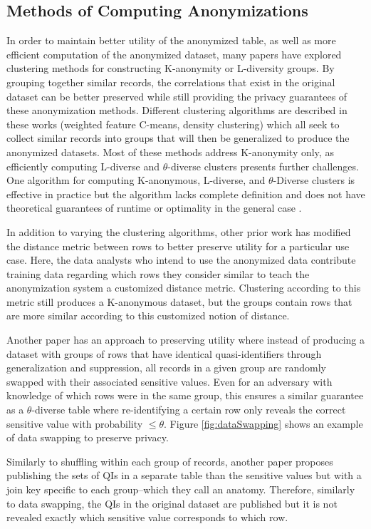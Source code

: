 \subsection{Methods of Computing Anonymizations}
In order to maintain better utility of the anonymized table, as well as more efficient computation of the anonymized dataset, many papers have explored clustering methods for constructing K-anonymity or L-diversity groups. By grouping together similar records, the correlations that exist in the original dataset can be better preserved while still providing the privacy guarantees of these anonymization methods\cite{niClustering,liuDensity,chiuClustering}. Different clustering algorithms are described in these works (weighted feature C-means, density clustering) which all seek to collect similar records into groups that will then be generalized to produce the anonymized datasets. Most of these methods address K-anonymity only, as efficiently computing L-diverse and $\theta$-diverse clusters presents further challenges. One algorithm for computing K-anonymous, L-diverse, and $\theta$-Diverse clusters is effective in practice but the algorithm lacks complete definition and does not have theoretical guarantees of runtime or optimality in the general case \cite{yangEnhanced}.

In addition to varying the clustering algorithms, other prior work has modified the distance metric between rows to better preserve utility for a particular use case\cite{jiaPad}. Here, the data analysts who intend to use the anonymized data contribute training data regarding which rows they consider similar to teach the anonymization system a customized distance metric. Clustering according to this metric still produces a K-anonymous dataset, but the groups contain rows that are more similar according to this customized notion of distance.

Another paper\cite{soriaSwapping} has an approach to preserving utility where instead of producing a dataset with groups of rows that have identical quasi-identifiers through generalization and suppression, all records in a given group are randomly swapped with their associated sensitive values. Even for an adversary with knowledge of which rows were in the same group, this ensures a similar guarantee as a $\theta$-diverse table where re-identifying a certain row only reveals the correct sensitive value with probability $\leq\theta$. Figure \ref{fig:dataSwapping} shows an example of data swapping to preserve privacy.

Similarly to shuffling within each group of records, another paper\cite{xiaoAnatomy} proposes publishing the sets of QIs in a separate table than the sensitive values but with a join key specific to each group--which they call an anatomy. Therefore, similarly to data swapping\cite{soriaSwapping}, the QIs in the original dataset are published but it is not revealed exactly which sensitive value corresponds to which row.

